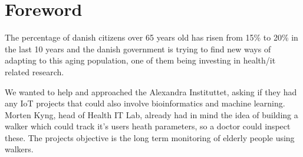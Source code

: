 
\chapter*{Foreword}
\label{cha:foreword}

\bigskip
\bigskip
\bigskip
The percentage of danish citizens over 65 years old has risen from 15\% to 20\% in the last 10 years and the danish government is trying to find new ways of adapting to this aging population, one of them being investing in health/it related research.
\bigskip
\bigskip
\bigskip

We wanted to help and approached the Alexandra Instituttet, asking if they had any IoT projects that could also involve bioinformatics and machine learning. Morten Kyng, head of Health IT Lab, already had in mind the idea of building a walker which could track it’s users heath parameters, so a doctor could inspect these. The projects objective is the long term monitoring of elderly people using walkers. 



